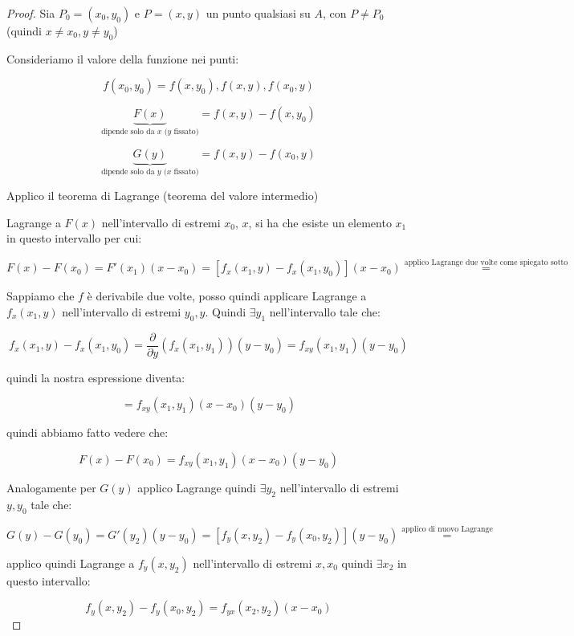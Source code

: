 \documentclass[11pt]{article}
\begin{document}
\begin{proof}
       Sia $P_0=(x_0,y_0)$ e $P=(x,y)$ un punto qualsiasi su $A$, con $P \neq P_0$ (quindi $x \neq x_0, y \neq y_0$)

       Consideriamo il valore della funzione nei punti:

       \[
           f(x_0,y_0) = f(x,y_0), f(x,y), f(x_0,y)
       \]

       \[
           \underbrace{F(x)}_\text{dipende solo da $x$ ($y$ fissato)} = f(x,y) - f(x,y_0)
       \]

       \[
           \underbrace{G(y)}_\text{dipende solo da $y$ ($x$ fissato)}  = f(x,y) - f(x_0,y)
       \]

       Applico il teorema di Lagrange (teorema del valore intermedio)

       Lagrange a $F(x)$ nell'intervallo di estremi $x_0$, $x$, si ha che esiste un elemento $x_1$ in questo intervallo per cui:

       \[
           F(x)- F(x_0) = F'(x_1) (x-x_0) = [f_x(x_1,y) - f_x(x_1,y_0) ] (x- x_0)  \overset{\text{applico Lagrange due volte come spiegato sotto}}{=}
       \]

       Sappiamo che $f$ è derivabile due volte, posso quindi applicare Lagrange a $f_x(x_1,y)$ nell'intervallo di estremi $y_0,y$. Quindi $\exists y_1$ nell'intervallo tale che:

       \[
           f_x(x_1,y) - f_x(x_1,y_0) = \frac{\partial }{\partial y}(f_x(x_1,y_1))(y-y_0) = f_{xy}(x_1,y_1)(y-y_0)
       \]

       quindi la nostra espressione diventa:

       \[
           = f_{xy}(x_1,y_1)(x-x_0) (y-y_0)
       \]

       quindi abbiamo fatto vedere che:

       \[
           F(x) -F(x_0) = f_{xy}(x_1,y_1) (x-x_0)(y-y_0)
       \]

       Analogamente per $G(y)$ applico Lagrange quindi $\exists y_2$ nell'intervallo di estremi $y,y_0$ tale che:

       \[
           G(y) -G(y_0) = G'(y_2) (y-y_0) = [f_y(x,y_2) - f_y(x_0,y_2)] (y-y_0) \overset{\text{applico di nuovo Lagrange}}{=}
       \]

       applico quindi Lagrange a $f_y(x,y_2)$ nell'intervallo di estremi $x,x_0$ quindi $\exists x_2$ in questo intervallo:

       \[
           f_y(x,y_2) - f_y(x_0,y_2) = f_{yx}(x_2,y_2)(x-x_0)
       \]


\end{proof}
\end{document}
